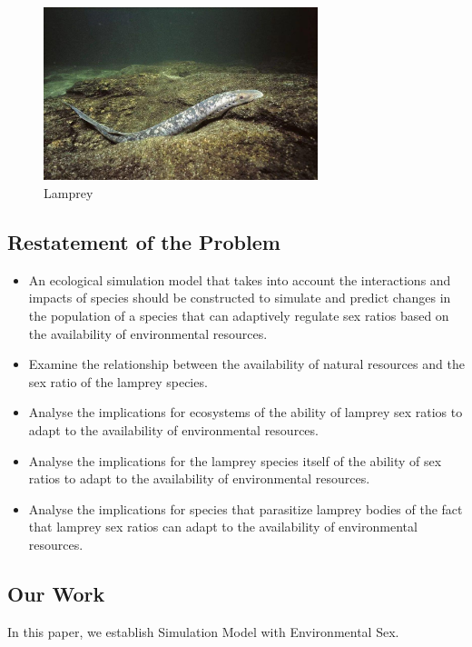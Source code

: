 \documentclass{mcmthesis}
\begin{document}
\begin{figure}[h]  %
\small
\centering  %
\includegraphics[width=8cm]{figures/lamprey_background.jpg}  %
\caption{Lamprey} \label{fig:Lamprey}  %
\end{figure}  %

\subsection{Restatement of the Problem }

\begin{itemize}  %
\item An ecological simulation model that takes into account the interactions and impacts of species should be constructed to simulate and predict changes in the population of a species that can adaptively regulate sex ratios based on the availability of environmental resources.
\item Examine the relationship between the availability of natural resources and the sex ratio of the lamprey species. 
\item Analyse the implications for ecosystems of the ability of lamprey sex ratios to adapt to the availability of environmental resources. 
\item Analyse the implications for the lamprey species itself of the ability of sex ratios to adapt to the availability of environmental resources. 
\item Analyse the implications for species that parasitize lamprey bodies of the fact that lamprey sex ratios can adapt to the availability of environmental resources. 
\end{itemize}  %

\subsection{Our Work}
In this paper, we establish Simulation Model with Environmental Sex.
\end{document}
